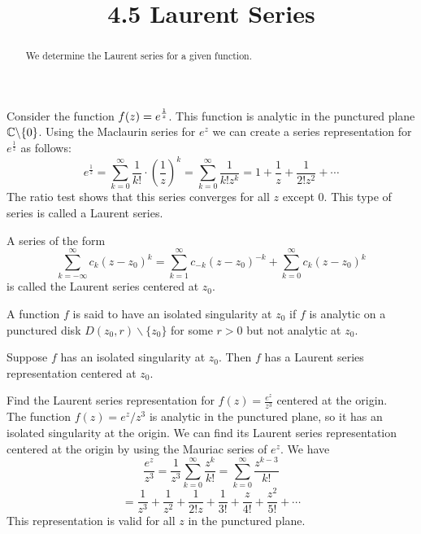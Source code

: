 \documentclass[handout]{ximera}
\title{4.5 Laurent Series}
\begin{document}
\begin{abstract}
We determine the Laurent series for a given function.
\end{abstract}

\maketitle

Consider the function $\displaystyle f(z) = e^\frac{1}{z}$. This function is analytic in the punctured plane $\mathbb C\backslash\{0\}$.
Using the Maclaurin series for $e^z$ we can create a series representation for $e^\frac{1}{z}$ as follows:
\[
e^\frac{1}{z} = \sum_{k=0}^\infty \frac{1}{k!} \cdot \left(\frac{1}{z}\right)^k = \sum_{k=0}^\infty \frac{1}{k!z^k} = 1+ \frac{1}{z} + \frac{1}{2! z^2} + \cdots
\]
 The ratio test shows that this series converges for all $z$ except $0$. This type of series is called a Laurent series.
 

\begin{definition} 
A series of the form 
\[
\sum_{k=-\infty}^\infty c_k(z-z_0)^k = \sum_{k=1}^\infty c_{-k}(z-z_0)^{-k} + \sum_{k=0}^\infty c_k(z-z_0)^k
\]
is called the Laurent series centered at $z_0$.
\end{definition}

\begin{definition}
A function $f$ is said to have an isolated singularity at $z_0$ if $f$ is analytic on a punctured disk $D(z_0, r)\backslash\{z_0\}$ for some $r>0$
but not analytic at $z_0$.
\end{definition}

\begin{theorem}
Suppose $f$ has an isolated singularity at $z_0$. Then $f$ has a Laurent series representation centered at $z_0$.
\end{theorem}

\begin{example}[example 1]
Find the Laurent series representation for $f(z) = \frac{e^z}{z^3}$ centered at the origin.\\
The function $f(z) = e^z/z^3$ is analytic in the punctured plane, so it has an isolated singularity at the origin.
We can find its Laurent series representation centered at the origin by using the Mauriac series of $e^z$.
We have
\[
\frac{e^z}{z^3} = \frac{1}{z^3} \sum_{k=0}^\infty \frac{z^k}{k!} = \sum_{k=0}^\infty \frac{z^{k-3}}{k!} 
\]
\[
= \frac{1}{z^3} + \frac{1}{z^2} + \frac{1}{2!z} + \frac{1}{3!} + \frac{z}{4!} + \frac{z^2}{5!} + \cdots
\]
This representation is valid for all $z$ in the punctured plane.
\end{example}
\end{document}
